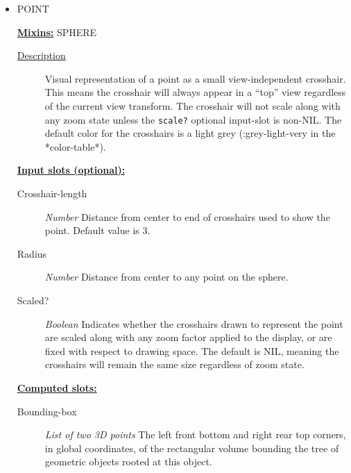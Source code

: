 \documentclass [11pt]{book}
\begin{document}
\begin{itemize}
\item {}POINT


\textbf{
\underline{Mixins:}} SPHERE





\begin{description}

\item [
\underline{Description}]


Visual representation of a point as a small view-independent crosshair. This means
the crosshair will always appear in a ``top'' view regardless of the current view transform. The crosshair will
not scale along with any zoom state unless the \texttt{scale?} optional input-slot is non-NIL. The default
color for the crosshairs is a light grey (:grey-light-very in the *color-table*).



\end{description}








\textbf{
\underline{Input slots (optional):}}

\begin{description}

\item [Crosshair-length]
\emph{Number} Distance from center to end of crosshairs used to show the point. Default value is 3.


\item [Radius]
\emph{Number} Distance from center to any point on the sphere.


\item [Scaled?]
\emph{Boolean} Indicates whether the crosshairs drawn to represent the point are scaled along with
any zoom factor applied to the display, or are fixed with respect to drawing space. The default is NIL,
meaning the crosshairs will remain the same size regardless of zoom state.


\end{description}






\textbf{
\underline{Computed slots:}}

\begin{description}

\item [Bounding-box]
\emph{List of two 3D points} The left front bottom and right rear top corners, in global coordinates,
of the rectangular volume bounding the tree of geometric objects rooted at this object.



\end{description}
\end{itemize}
\end{document}
